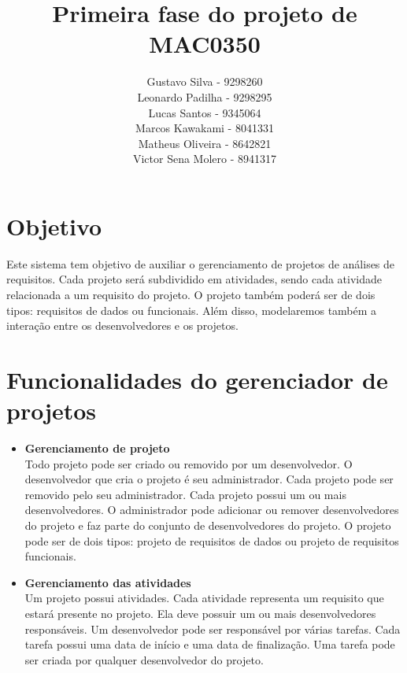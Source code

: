 \documentclass{article}
\title{Primeira fase do projeto de MAC0350}
\author{Gustavo Silva - 9298260\\Leonardo Padilha - 9298295 \\Lucas Santos - 9345064 \\Marcos Kawakami - 8041331 \\Matheus Oliveira - 8642821 \\Victor Sena Molero - 8941317}
\date{}
\begin{document}
\maketitle

\section{Objetivo}
Este sistema tem objetivo de auxiliar o gerenciamento de projetos de análises de requisitos. Cada projeto será subdividido em atividades, sendo cada atividade relacionada a um requisito do projeto. O projeto também poderá ser de dois tipos: requisitos de dados ou funcionais. Além disso, modelaremos também a interação entre os desenvolvedores e os projetos.

\section{Funcionalidades do gerenciador de projetos}
\begin{itemize}
    \item \textbf{Gerenciamento de projeto}
    \\Todo projeto pode ser criado ou removido por um desenvolvedor. O desenvolvedor que cria o projeto é seu administrador. Cada projeto pode ser removido pelo seu administrador. Cada projeto possui um ou mais desenvolvedores. O administrador pode adicionar ou remover desenvolvedores do projeto e faz parte do conjunto de desenvolvedores do projeto. O projeto pode ser de dois tipos: projeto de requisitos de dados ou projeto de requisitos funcionais.
    \item \textbf{Gerenciamento das atividades}
    \\Um projeto possui atividades. Cada atividade representa um requisito que estará presente no projeto. Ela deve possuir um ou mais desenvolvedores responsáveis. Um desenvolvedor pode ser responsável por várias tarefas. Cada tarefa possui uma data de início e uma data de finalização. Uma tarefa pode ser criada por qualquer desenvolvedor do projeto.
\end{itemize}
\end{document}
